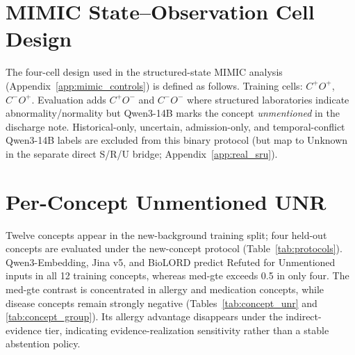 \documentclass[11pt]{article}
\begin{document}
\section{MIMIC State--Observation Cell Design}
\label{app:mimic_controls_detail}
The four-cell design used in the structured-state MIMIC analysis
(Appendix~\ref{app:mimic_controls}) is defined as follows. Training cells:
$C^+O^+$, $C^-O^+$.
Evaluation adds $C^+O^-$ and $C^-O^-$ where structured laboratories indicate
abnormality/normality but Qwen3-14B marks the concept \emph{unmentioned} in the
discharge note.
Historical-only, uncertain, admission-only, and temporal-conflict Qwen3-14B
labels are excluded from this binary protocol (but map to Unknown in the
separate direct S/R/U bridge; Appendix~\ref{app:real_sru}).

\section{Per-Concept Unmentioned UNR}
\label{app:concept_unr}

Twelve concepts appear in the new-background training split; four held-out
concepts are evaluated under the new-concept protocol (Table~\ref{tab:protocols}).
Qwen3-Embedding, Jina v5, and BioLORD predict Refuted for Unmentioned inputs in
all 12 training concepts, whereas med-gte exceeds 0.5 in only four. The med-gte
contrast is concentrated in allergy and medication concepts, while disease
concepts remain strongly negative (Tables~\ref{tab:concept_unr} and
\ref{tab:concept_group}). Its allergy advantage disappears under the
indirect-evidence tier, indicating evidence-realization sensitivity rather than
a stable abstention policy.
\end{document}
